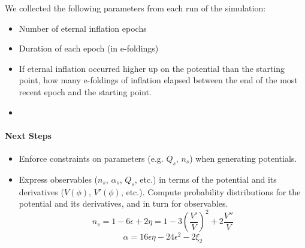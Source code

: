 
We collected the following parameters from each run of the simulation:
\begin{itemize}
\item Number of eternal inflation epochs
\item Duration of each epoch (in e-foldings)
\item If eternal inflation occurred higher up on the potential than the starting point, how many e-foldings of inflation elapsed between the end of the most recent epoch and the starting point.
\item 
\end{itemize}
\paragraph{Next Steps}

\begin{itemize}
\item Enforce constraints on parameters (e.g. $Q_s$, $n_s$) when generating potentials.
\item Express observables ($n_s$, $\alpha_s$, $Q_s$, etc.) in terms of the potential and its derivatives ($V(\phi)$, $V'(\phi)$, etc.).  Compute probability distributions for the potential and its derivatives, and in turn for observables.
\[ n_s = 1 - 6\epsilon + 2\eta = 1 - 3 \left( \frac{V'}{V} \right)^2 + 2 \frac{V''}{V} \]
\[ \alpha = 16\epsilon\eta - 24 \epsilon^2 - 2 \xi_2 \]
\end{itemize}



